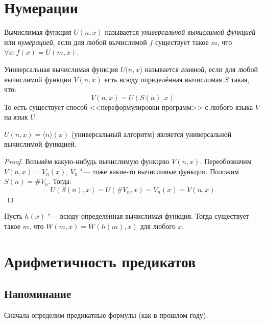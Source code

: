 \section{Нумерации}
\begin{Def}
	Вычислимая функция $U(n, x)$ называется \textit{универсальной вычислимой функцией} или \textit{нумерацией}, если для любой
	вычислимой $f$ существует такое $m$, что $\forall x \colon f(x) = U(m, x)$.
\end{Def}
\begin{Def}
	Универсальная вычислимая функция $U(n, x$) называется \textit{главной}, если для любой вычислимой функции $V(n, x)$
	есть всюду определённая вычислимая $S$ такая, что:
	\[ V(n, x) = U(S(n), x) \]
	То есть существует способ <<переформулировки программ>> с любого языка $V$ на язык $U$.
\end{Def}
\begin{exmp}
	$U(n, x) = \langle n \rangle(x)$ (универсальный алгоритм) является универсальной вычислимой функцией.
\end{exmp}
\begin{proof}
	Возьмём какую-нибудь вычислимую функцию $V(n, x)$.
	Переобозначим $V(n, x)=V_n(x)$, $V_n$ "--- тоже какие-то вычислимые функции.
	Положим $S(n)=\# V_n$.
	Тогда:
	\[ U(S(n), x) = U(\# V_n, x) = V_n(x) = V(n, x) \]
\end{proof}

\begin{theorem}
	Пусть $h(x)$ "--- всюду определённая вычислимая функция.
	Тогда существует такое $m$, что $W(m, x) = W(h(m), x)$ для любого $x$.
\end{theorem}

\section{Арифметичность предикатов}
\subsection{Напоминание}
Сначала определим предикатные формулы (как в прошлом году).

